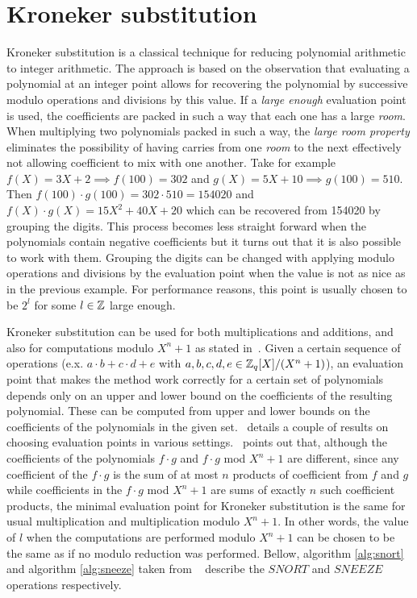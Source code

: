 \section{Kroneker substitution}

Kroneker substitution \parencite*{KroneckerGrundzgeEA} is a classical technique for reducing polynomial arithmetic to integer arithmetic. The approach is based on the observation that evaluating a polynomial at an integer point allows for recovering the polynomial by successive modulo operations and divisions by this value. If a \emph{large enough} evaluation point is used, the coefficients are packed in such a way that each one has a large \emph{room}. When multiplying two polynomials packed in such a way, the \emph{large room property} eliminates the possibility of having carries from one \emph{room} to the next effectively not allowing coefficient to mix with one another. Take for example $f(X) = 3 X + 2 \implies f(100) = 302$ and $g(X) = 5 X + 10 \implies g(100) = 510$. Then $f(100) \cdot g(100) = 302 \cdot 510 = 154020$ and $f(X) \cdot g(X) = 15 X^2 + 40 X + 20$ which can be recovered from 154020 by grouping the digits. This process becomes less straight forward when the polynomials contain negative coefficients but it turns out that it is also possible to work with them. Grouping the digits can be changed with applying modulo operations and divisions by the evaluation point when the value is not as nice as in the previous example. For performance reasons, this point is usually chosen to be $2^l$ for some $l \in \mathbb{Z}$ large enough. 

Kroneker substitution can be used for both multiplications and additions, and also for computations modulo $X^n + 1$ as stated in~\parencite{cryptoeprint:2020/1303}. Given a certain sequence of operations (e.x. $a \cdot b + c \cdot d + e$ with $a, b, c, d, e \in \mathbb{Z}_q[X]/(X^n + 1)$), an evaluation point that makes the method work correctly for a certain set of polynomials depends only on an upper and lower bound on the coefficients of the resulting polynomial. These can be computed from upper and lower bounds on the coefficients of the polynomials in the given set.~\parencite{cryptoeprint:2018/425} details a couple of results on choosing evaluation points in various settings.~\parencite{cryptoeprint:2020/1303} points out that, although the coefficients of the polynomials $f \cdot g$ and $f \cdot g$ mod $X^n + 1$ are different, since any coefficient of the $f \cdot g$  is the sum of at most $n$ products of coefficient from $f$ and $g$ while coefficients in the $f \cdot g$ mod $X^n + 1$ are sums of exactly $n$ such coefficient products, the minimal evaluation point for Kroneker substitution is the same for usual multiplication and multiplication modulo $X^n + 1$. In other words, the value of $l$ when the computations are performed modulo $X^n + 1$ can be chosen to be the same as if no modulo reduction was performed. Bellow, algorithm \cref{alg:snort} and algorithm \cref{alg:sneeze} taken from ~\parencite*{cryptoeprint:2018/425} describe the $SNORT$ and $SNEEZE$ operations respectively.


